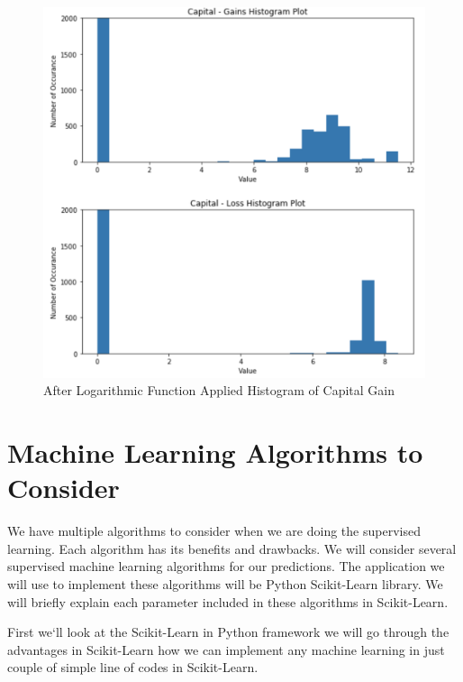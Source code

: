 \documentclass[sigconf]{acmart}
\begin{document}
 \begin{figure}[!ht]
  \centering
      \includegraphics[width=\columnwidth]{project/images/logarithmic-applied.png}
  \caption{After Logarithmic Function Applied Histogram of Capital Gain \cite{}}\label{fig:Hist-capital-log}
\end{figure}

 


\section{Machine Learning Algorithms to Consider}
We have multiple algorithms to consider when we are doing the supervised learning. Each algorithm has its benefits and drawbacks. We will consider several supervised machine learning algorithms for our predictions. The application we will use to implement these algorithms will be Python Scikit-Learn library. We will briefly explain each parameter included in these algorithms in Scikit-Learn.

\par First we`ll look at the Scikit-Learn in Python framework we will go through the advantages in Scikit-Learn how we can implement any machine learning in just couple of simple line of codes in Scikit-Learn. 
\end{document}
